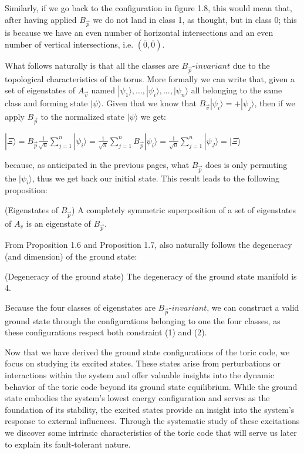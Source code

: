 \documentclass{Configuration_Files/PoliMi3i_thesis}
\begin{document}
Similarly, if we go back to the configuration in figure 1.8, this would mean that, after having applied $B_{\vec{p}} $ we do not land in class 1, as thought, but in class 0; this is because we have an even number of horizontal intersections and an even number of vertical intersections, i.e.   $(\overline{0}, \overline{0})$.

What follows naturally is that all the classes are $B_{\vec{p}} $-$invariant$ due to the topological characteristics of the torus. More formally we can write that, given a set of eigenstates of $A_{\vec{v}} $ named $|\psi_1\rangle,...,|\psi_i\rangle,...,|\psi_n\rangle$ all belonging to the same class and forming state $|\psi\rangle$. Given that we know that $B_{\vec{v}} |\psi_i\rangle=+|\psi_j\rangle$, then if we apply $B_{\vec{p}} $ to the normalized state $|\psi\rangle$ we get:

\begin{center}
	$|\Xi\rangle= B_{\vec{p}}  \frac{1}{\sqrt{n}} \sum_{j=1}^{n} |\psi_i\rangle = \frac{1}{\sqrt{n}} \sum_{j=1}^{n} B_{\vec{p}} |\psi_i\rangle = \frac{1}{\sqrt{n}} \sum_{j=1}^{n} |\psi_J\rangle =|\Xi\rangle$
\end{center}

because, as anticipated in the previous pages, what $B_{\vec{p}} $ does is only permuting the $|\psi_i\rangle$, thus we get back our initial state. This result leads to the following proposition:

\begin{proposition}(Eigenstates of $B_{\vec{p}} $) A completely symmetric superposition of a set of eigenstates of $A_v$ is an eigenstate of $B_{\vec{p}} $.
\end{proposition}

From Proposition 1.6 and Proposition 1.7, also naturally follows the degeneracy (and dimension) of the ground state: \newline

\begin{proposition} (Degeneracy of the ground state) The degeneracy of the ground state manifold is $4$. 
\end{proposition}

Because the four classes of eigenstates are $B_{\vec{p}} $-$invariant$, we can construct a valid ground state through the configurations belonging to one the four classes, as these configurations respect both constraint (1) and (2).\newline 

Now that we have derived the ground state configurations of the toric code, we focus on studying its excited states. These states arise from perturbations or interactions within the system and offer valuable insights into the dynamic behavior of the toric code beyond its ground state equilibrium. While the ground state embodies the system's lowest energy configuration and serves as the foundation of its stability, the excited states provide an insight into the system's response to external influences. 
Through the systematic study of these excitations we discover some intrinsic characteristics of the toric code that will serve us later to explain its fault-tolerant nature.
\end{document}
